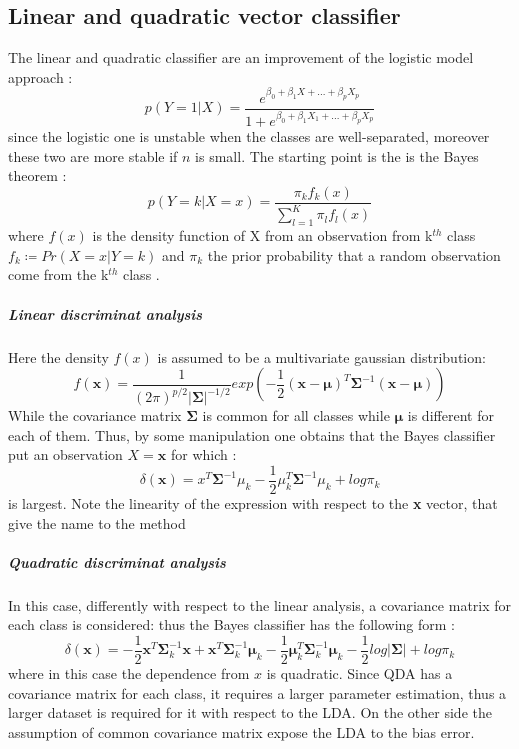 \documentclass[
12pt, %
a4paper, %
oneside, %
headinclude,footinclude, %
BCOR5mm, %
]{scrartcl}
\begin{document}
\subsection{Linear and quadratic vector classifier}
The linear and quadratic classifier are an improvement of the logistic model approach \cite{james2013introduction}: 
\begin{equation}
p(Y=1|X)=\dfrac{e^{\beta_{0}+\beta_{1}X+...+\beta_{p}X_{p}}}{1+e^{\beta_{0}+\beta_{1}X_{1}+...+\beta_{p}X_{p}}}
\end{equation}
since the logistic one is unstable when the classes are well-separated, moreover these two are more stable if $n$ is small. The starting point is the is the Bayes theorem \cite{james2013introduction}:
\begin{equation}
p(Y=k|X=x)=\dfrac{\pi_{k}f_{k}(x)}{\sum_{l=1}^{K}\pi_{l}f_{l}(x)}
\end{equation}
where $f(x)$ is the density function of X from an observation from k$^{th}$ class  $f_{k}\coloneqq Pr(X=x|Y=k)$ and $\pi_{k}$ the prior probability that a random observation come from the k$^{th}$ class \cite{james2013introduction}. 

\subparagraph{Linear discriminat analysis}
Here the density $f(x)$ is assumed to be a multivariate gaussian distribution\cite{james2013introduction}: 
\begin{equation}
f(\textbf{x})=\dfrac{1}{\left(2 \pi\right)^{p/2}\lvert \boldsymbol {\Sigma}\rvert^{-1/2} }exp \left(-\frac{1}{2}\left(\textbf{x}-\boldsymbol{\mu}\right)^{T}\boldsymbol {\Sigma}^{-1}\left(\textbf{x}-\boldsymbol{\mu}\right)\right)
\end{equation}
While the covariance matrix $\boldsymbol {\Sigma}$ is common for all classes while $\boldsymbol{\mu}$ is different for each of them. Thus, by some manipulation one obtains that the Bayes classifier put an observation $X=\textbf{x}$ for which \cite{james2013introduction}:
\begin{equation}
\delta(\textbf{x})=x^{T} \boldsymbol {\Sigma}^{-1} \mu_{k}-\frac{1}{2}\mu^{T}_{k}\boldsymbol {\Sigma}^{-1}\mu_{k}+log\pi_{k}
\end{equation}
is largest. Note the linearity of the expression with respect to the \textbf{x} vector, that give the name to the method 
\subparagraph{Quadratic discriminat analysis}
In this case, differently with respect to the linear analysis, a covariance matrix for each class is considered: thus the Bayes classifier has the following form \cite{james2013introduction}:  
\begin{equation}
\delta(\textbf{x})=-\dfrac{1}{2}\textbf{x}^{T}\boldsymbol {\Sigma}^{-1}_{k}\textbf{x}+\textbf{x}^{T}\boldsymbol {\Sigma}^{-1}_{k}\boldsymbol{\mu}_{k}-\dfrac{1}{2}\boldsymbol{\mu}_{k}^{T}\boldsymbol {\Sigma}^{-1}_{k}\boldsymbol{\mu}_{k}-\dfrac{1}{2}log\lvert \boldsymbol {\Sigma}\rvert+log\pi_{k}
\end{equation}
where in this case the dependence from $x$ is quadratic. Since QDA has a covariance matrix for each class, it requires a larger parameter estimation, thus a larger dataset is required for it with respect to the LDA. On the other side the assumption of common covariance matrix expose the LDA to the bias error.
\end{document}
